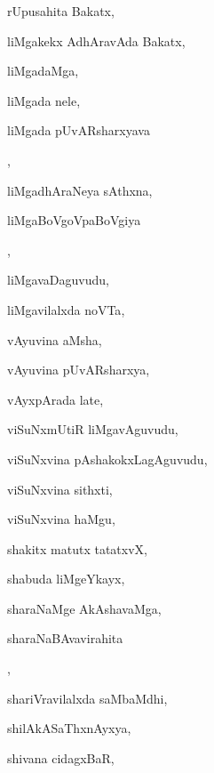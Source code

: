 \begin{multicols}{3}
{\noindent
{rUpusahita Bakatx}, \pageref{rUpusahita Bakatx}

\noindent
{liMgakekx AdhAravAda Bakatx}, \pageref{liMgakekx AdhAravAda Bakatx}

\noindent
{liMgadaMga}, \pageref{liMgadaMga}

\noindent
{liMgada nele}, \pageref{liMgada nele}

\noindent
{liMgada pUvARsharxyava}

\noindent
{}, \pageref{liMgada pUvARsharxyava kaLeyuvudu}

\noindent
{liMgadhAraNeya sAthxna}, \pageref{liMgadhAraNeya sAthxna}

\noindent
{liMgaBoVgoVpaBoVgiya}

\noindent
{}, \pageref{liMgaBoVgoVpaBoVgiya saMgasuKa}

\noindent
{liMgavaDaguvudu}, \pageref{liMgavaDaguvudu}

\noindent
{liMgavilalxda noVTa}, \pageref{liMgavilalxda noVTa}

\noindent
{vAyuvina aMsha}, \pageref{vAyuvina aMsha}

\noindent
{vAyuvina pUvARsharxya}, \pageref{vAyuvina pUvARsharxya}

\noindent
{vAyxpArada late}, \pageref{vAyxpArada late}

\noindent
{viSuNxmUtiR liMgavAguvudu}, \pageref{viSuNxmUtiR liMgavAguvudu}

\noindent
{viSuNxvina pAshakokxLagAguvudu}, \pageref{viSuNxvina pAshakokxLagAguvudu}

\noindent
{viSuNxvina sithxti}, \pageref{viSuNxvina sithxti}

\noindent
{viSuNxvina haMgu}, \pageref{viSuNxvina haMgu}

\noindent
{shakitx matutx tatatxvX}, \pageref{shakitx matutx tatatxvX}

\noindent
{shabuda liMgeYkayx}, \pageref{shabuda liMgeYkayx}

\noindent
{sharaNaMge AkAshavaMga}, \pageref{sharaNaMge AkAshavaMga}

\noindent
{sharaNaBAvavirahita}

\noindent
{}, \pageref{sharaNaBAvavirahita samayxgfjAcnxni}

\noindent
{shariVravilalxda saMbaMdhi}, \pageref{shariVravilalxda saMbaMdhi}

\noindent
{shilAkASaThxnAyxya}, \pageref{shilAkASaThxnAyxya}

\noindent
{shivana cidagxBaR}, \pageref{shivana cidagxBaR}

}
\end{multicols}

